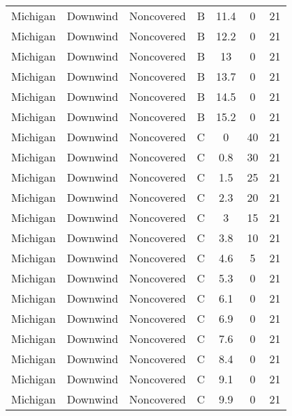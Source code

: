 \documentclass{article}
\begin{document}
\begin{longtable}[c]{ccccccc}
Michigan  & Downwind  & Noncovered & B               & 11.4         & 0           & 21  \\
Michigan  & Downwind  & Noncovered & B               & 12.2         & 0           & 21  \\
Michigan  & Downwind  & Noncovered & B               & 13           & 0           & 21  \\
Michigan  & Downwind  & Noncovered & B               & 13.7         & 0           & 21  \\
Michigan  & Downwind  & Noncovered & B               & 14.5         & 0           & 21  \\
Michigan  & Downwind  & Noncovered & B               & 15.2         & 0           & 21  \\
Michigan  & Downwind  & Noncovered & C               & 0            & 40          & 21  \\
Michigan  & Downwind  & Noncovered & C               & 0.8          & 30          & 21  \\
Michigan  & Downwind  & Noncovered & C               & 1.5          & 25          & 21  \\
Michigan  & Downwind  & Noncovered & C               & 2.3          & 20          & 21  \\
Michigan  & Downwind  & Noncovered & C               & 3            & 15          & 21  \\
Michigan  & Downwind  & Noncovered & C               & 3.8          & 10          & 21  \\
Michigan  & Downwind  & Noncovered & C               & 4.6          & 5           & 21  \\
Michigan  & Downwind  & Noncovered & C               & 5.3          & 0           & 21  \\
Michigan  & Downwind  & Noncovered & C               & 6.1          & 0           & 21  \\
Michigan  & Downwind  & Noncovered & C               & 6.9          & 0           & 21  \\
Michigan  & Downwind  & Noncovered & C               & 7.6          & 0           & 21  \\
Michigan  & Downwind  & Noncovered & C               & 8.4          & 0           & 21  \\
Michigan  & Downwind  & Noncovered & C               & 9.1          & 0           & 21  \\
Michigan  & Downwind  & Noncovered & C               & 9.9          & 0           & 21  \\

\end{longtable}
\end{document}
